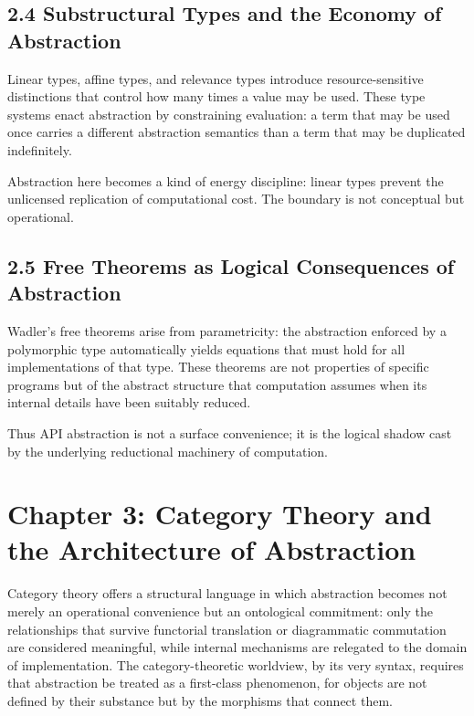 \documentclass[12pt,letterpaper]{article}
\begin{document}
\subsection{2.4 Substructural Types and the Economy of Abstraction}

Linear types, affine types, and relevance types introduce resource-sensitive distinctions that control how many times a value may be used. These type systems enact abstraction by constraining evaluation: a term that may be used once carries a different abstraction semantics than a term that may be duplicated indefinitely.

Abstraction here becomes a kind of energy discipline: linear types prevent the unlicensed replication of computational cost. The boundary is not conceptual but operational.

\subsection{2.5 Free Theorems as Logical Consequences of Abstraction}

Wadler’s free theorems arise from parametricity: the abstraction enforced by a polymorphic type automatically yields equations that must hold for all implementations of that type. These theorems are not properties of specific programs but of the abstract structure that computation assumes when its internal details have been suitably reduced.

Thus API abstraction is not a surface convenience; it is the logical shadow cast by the underlying reductional machinery of computation.

\newpage

\section{Chapter 3: Category Theory and the Architecture of Abstraction}

Category theory offers a structural language in which abstraction becomes not merely an operational convenience but an ontological commitment: only the relationships that survive functorial translation or diagrammatic commutation are considered meaningful, while internal mechanisms are relegated to the domain of implementation. The category-theoretic worldview, by its very syntax, requires that abstraction be treated as a first-class phenomenon, for objects are not defined by their substance but by the morphisms that connect them.
\end{document}
